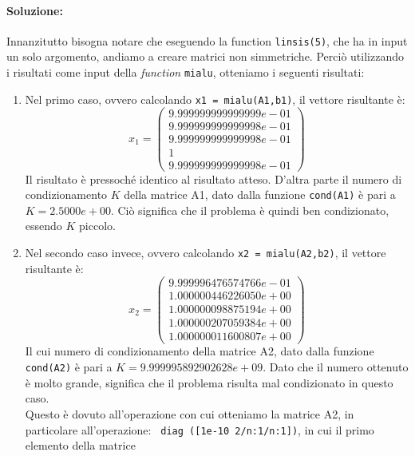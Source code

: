 \documentclass[12pt]{article}
\begin{document}
\paragraph{Soluzione:}
Innanzitutto bisogna notare che eseguendo la function \texttt{linsis(5)}, che ha in input un solo argomento, andiamo a creare matrici non simmetriche. 
Perciò utilizzando i risultati come input della \textit{function} \texttt{mialu}, otteniamo i seguenti risultati:
\begin{enumerate}
    \item Nel primo caso, ovvero calcolando \texttt{x1 = mialu(A1,b1)}, il vettore risultante è: 
    \begin{equation*} x_1=
        \begin{pmatrix}
            9.999999999999999e-01\\
            9.999999999999998e-01\\
            9.999999999999998e-01\\
            1\\
            9.999999999999998e-01
        \end{pmatrix}
    \end{equation*}
    Il risultato è pressoché identico al risultato atteso. D'altra parte il numero di condizionamento \(K\) della matrice A1, dato dalla funzione \texttt{cond(A1)}
    è pari a \(K = 2.5000e+00\). Ciò significa che il problema è quindi ben condizionato, essendo \(K\) piccolo.
    \item Nel secondo caso invece, ovvero calcolando \texttt{x2 = mialu(A2,b2)}, il vettore risultante è:
    \begin{equation*} x_2=
        \begin{pmatrix}
            9.999996476574766e-01\\
            1.000000446226050e+00\\
            1.000000098875194e+00\\
            1.000000207059384e+00\\
            1.000000011600807e+00
        \end{pmatrix}
    \end{equation*}
    Il cui numero di condizionamento della matrice A2, dato dalla funzione \texttt{cond(A2)} è pari a \(K = 9.999995892902628e+09\). Dato che il numero ottenuto è molto 
    grande, significa che il problema risulta mal condizionato in questo caso. \\
    Questo è dovuto all'operazione con cui otteniamo la matrice A2, in particolare all'operazione: \texttt{ diag ([1e-10 2/n:1/n:1])}, in cui il primo elemento della matrice 

\end{enumerate}
\end{document}

